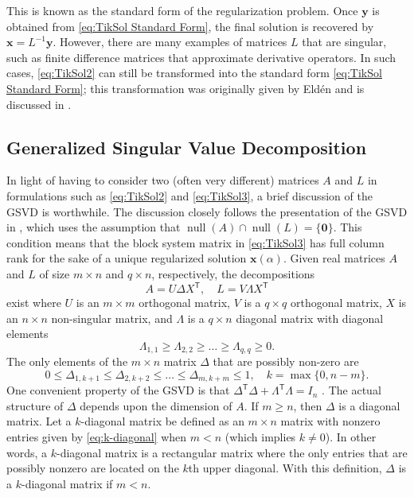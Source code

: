 \documentclass[12pt]{article}
\newcommand{\mA}{m}	%
\newcommand{\mL}{q}	%
\newcommand{\xVec}{\mathbf{x}}	%
\newcommand{\trans}[1]{{#1}^\mathsf{T}}	%
\DeclareMathOperator{\nullspace}{null}	%
\newcommand{\regparam}{\alpha}  %
\newcommand{\zeroVec}{\bm{0}}	%
\begin{document}
This is known as the standard form of the regularization problem. Once $\mathbf{y}$ is obtained from \eqref{eq:TikSol Standard Form}, the final solution is recovered by $\xVec = L^{-1}\mathbf{y}$.  However, there are many examples of matrices $L$ that are singular, such as finite difference matrices that approximate derivative operators. In such cases, \eqref{eq:TikSol2} can still be transformed into the standard form \eqref{eq:TikSol Standard Form}; this transformation was originally given by Eld\'{e}n \cite{Elden} and is discussed in \cite{Hansen:98}.

\subsection{Generalized Singular Value Decomposition} \label{sec:GSVD}
In light of having to consider two (often very different) matrices $A$ and $L$ in formulations such as \eqref{eq:TikSol2} and \eqref{eq:TikSol3}, a brief discussion of the GSVD is worthwhile. The discussion closely follows the presentation of the GSVD in \cite{ABT}, which uses the assumption that $\nullspace(A) \cap \nullspace(L) = \{\zeroVec\}$. This condition means that the block system matrix in \eqref{eq:TikSol3} has full column rank for the sake of a unique regularized solution $\xVec(\regparam)$. Given real matrices $A$ and $L$ of size $\mA \times n$ and $\mL \times n$, respectively, the decompositions
\begin{equation}
\label{eq:GSVD}
A = U\Delta\trans{X}, \quad L = V\Lambda\trans{X}
\end{equation}
exist where $U$ is an $\mA \times \mA$ orthogonal matrix, $V$ is a $\mL \times \mL$ orthogonal matrix, $X$ is an $n \times n$ non-singular matrix, and $\Lambda$ is a $\mL \times n$ diagonal matrix with diagonal elements
\[\Lambda_{1,1} \geq \Lambda_{2,2} \geq \ldots \geq \Lambda_{\mL,\mL} \geq 0.\]
The only elements of the $\mA \times n$ matrix $\Delta$ that are possibly non-zero are
\begin{equation}
\label{eq:k-diagonal}
 0 \leq \Delta_{1,k+1} \leq \Delta_{2,k+2} \leq \ldots \leq \Delta_{\mA,k+\mA} \leq 1, \quad k = \max \{0,n - \mA\}.
\end{equation}
One convenient property of the GSVD is that $\trans{\Delta}\Delta + \trans{\Lambda}\Lambda = I_n$ \cite[p.~104]{ABT}. The actual structure of $\Delta$ depends upon the dimension of $A$. If $\mA \geq n$, then $\Delta$ is a diagonal matrix. Let a $k$-diagonal matrix be defined as an $\mA \times n$ matrix with nonzero entries given by \eqref{eq:k-diagonal} when $\mA < n$ (which implies $k \neq 0$). In other words, a $k$-diagonal matrix is a rectangular matrix where the only entries that are possibly nonzero are located on the $k$th upper diagonal. With this definition, $\Delta$ is a $k$-diagonal matrix if $\mA < n$. \par 
\end{document}
